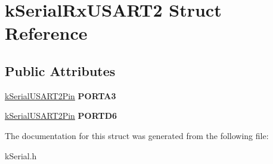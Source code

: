 \hypertarget{structkSerialRxUSART2}{}\section{k\+Serial\+Rx\+U\+S\+A\+R\+T2 Struct Reference}
\label{structkSerialRxUSART2}
\subsection*{Public Attributes}
\begin{DoxyCompactItemize}
\item 
\hyperlink{structkSerialUSART2Pin}{k\+Serial\+U\+S\+A\+R\+T2\+Pin} {\bfseries P\+O\+R\+T\+A3}\hypertarget{structkSerialRxUSART2_a1abbb81a52912daa906602a1dbb7f760}{}\label{structkSerialRxUSART2_a1abbb81a52912daa906602a1dbb7f760}

\item 
\hyperlink{structkSerialUSART2Pin}{k\+Serial\+U\+S\+A\+R\+T2\+Pin} {\bfseries P\+O\+R\+T\+D6}\hypertarget{structkSerialRxUSART2_aae0b07c2ad44fd08111196356e9be97b}{}\label{structkSerialRxUSART2_aae0b07c2ad44fd08111196356e9be97b}

\end{DoxyCompactItemize}


The documentation for this struct was generated from the following file\+:\begin{DoxyCompactItemize}
\item 
k\+Serial.\+h\end{DoxyCompactItemize}
